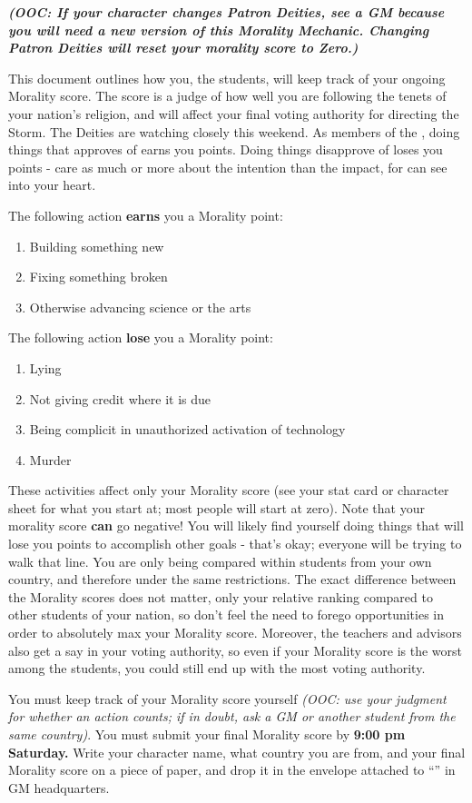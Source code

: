 \documentclass[green]{GL2020}
\begin{document}
\name{\gFPFStudentMorality{}}
\emph{\textbf{(OOC: If your character changes Patron Deities, see a GM because you will need a new version of this Morality Mechanic. Changing Patron Deities will reset your morality score to Zero.)}}

This document outlines how you, the students, will keep track of your ongoing Morality score. The score is a judge of how well you are following the tenets of your nation’s religion, and will affect your final voting authority for directing the Storm. The Deities are watching closely this weekend. As members of the \pTech{}, doing things that \cTechGod{} approves of earns you points. Doing things \cTechGod{\they} disapprove\cTechGod{\plural} of loses you points - \cTechGod{\they} care as much or more about the intention than the impact, for \cTechGod{\they} can see into your heart.

The following action \textbf{earns} you a Morality point:
\begin{enumerate}
  \item Building something new
  \item Fixing something broken
  \item Otherwise advancing science or the arts
\end{enumerate}

The following action \textbf{lose} you a Morality point:
\begin{enumerate}
  \item Lying
  \item Not giving credit where it is due
  \item Being complicit in unauthorized activation of technology
  \item Murder
\end{enumerate}

These activities affect only your Morality score (see your stat card or character sheet for what you start at; most people will start at zero).  Note that your morality score \textbf{can} go negative! You will likely find yourself doing things that will lose you points to accomplish other goals - that’s okay; everyone will be trying to walk that line. You are only being compared within students from your own country, and therefore under the same restrictions. The exact difference between the Morality scores does not matter, only your relative ranking compared to other students of your nation, so don’t feel the need to forego opportunities in order to absolutely max your Morality score. Moreover, the teachers and advisors also get a say in your voting authority, so even if your Morality score is the worst among the students, you could still end up with the most voting authority. 

You must keep track of your Morality score yourself \emph{(OOC: use your judgment for whether an action counts; if in doubt, ask a GM or another student from the same country)}. You must submit your final Morality score by \textbf{9:00 pm Saturday.} Write your character name, what country you are from, and your final Morality score on a piece of paper, and drop it in the envelope attached to “\sSignV{}” in GM headquarters. 
\end{document}
